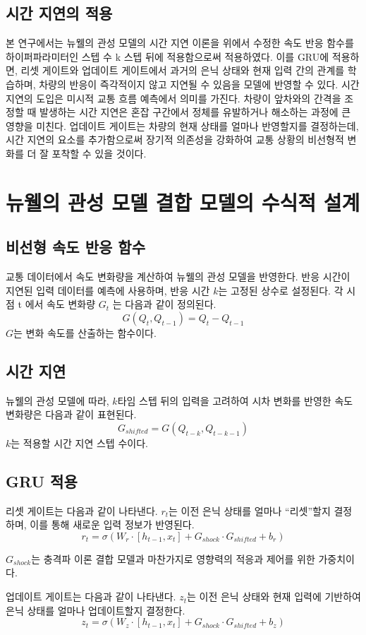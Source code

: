 \documentclass[11pt]{report}
\begin{document}
\subsection{시간 지연의 적용}
본 연구에서는 뉴웰의 관성 모델의 시간 지연 이론을 위에서 수정한 속도 반응 함수를 하이퍼파라미터인 스텝 수 k 스텝 뒤에 적용함으로써 적용하였다. 
이를 GRU에 적용하면, 리셋 게이트와 업데이트 게이트에서 과거의 은닉 상태와 현재 입력 간의 관계를 학습하며, 차량의 반응이 즉각적이지 않고 지연될 수 있음을 모델에 반영할 수 있다.
시간 지연의 도입은 미시적 교통 흐름 예측에서 의미를 가진다. 
차량이 앞차와의 간격을 조정할 때 발생하는 시간 지연은 혼잡 구간에서 정체를 유발하거나 해소하는 과정에 큰 영향을 미친다. 
업데이트 게이트는 차량의 현재 상태를 얼마나 반영할지를 결정하는데, 시간 지연의 요소를 추가함으로써 장기적 의존성을 강화하여 교통 상황의 비선형적 변화를 더 잘 포착할 수 있을 것이다.
\section{뉴웰의 관성 모델 결합 모델의 수식적 설계}
\subsection{비선형 속도 반응 함수}
교통 데이터에서 속도 변화량을 계산하여 뉴웰의 관성 모델을 반영한다. 
반응 시간이 지연된 입력 데이터를 예측에 사용하며, 반응 시간 $k$는 고정된 상수로 설정된다. 
각 시점  t 에서 속도 변화량  $G_t$ 는 다음과 같이 정의된다.
$$
G(Q_t, Q_{t-1}) = Q_t - Q_{t-1}
$$
$G$는 변화 속도를 산출하는 함수이다. 
\subsection{시간 지연}
뉴웰의 관성 모델에 따라,  $k$타임 스텝 뒤의 입력을 고려하여 시차 변화를 반영한 속도 변화량은 다음과 같이 표현된다. 
$$
G_{shifted} = G(Q_{t-k}, Q_{t-k-1})
$$
$k$는 적용할 시간 지연 스텝 수이다.

\subsection{GRU 적용}

리셋 게이트는 다음과 같이 나타낸다. 
$r_t$는 이전 은닉 상태를 얼마나 “리셋”할지 결정하며, 이를 통해 새로운 입력 정보가 반영된다.
$$
r_t = \sigma(W_r \cdot [h_{t-1}, x_t] + G_{shock} \cdot G_{shifted} + b_r)
$$

$G_{shock}$는 충격파 이론 결합 모델과 마찬가지로 영향력의 적응과 제어를 위한 가중치이다. 

업데이트 게이트는 다음과 같이 나타낸다. 
$z_t$는 이전 은닉 상태와 현재 입력에 기반하여 은닉 상태를 얼마나 업데이트할지 결정한다. 
$$
z_t = \sigma(W_z \cdot [h_{t-1}, x_t] + G_{shock} \cdot G_{shifted} + b_z)
$$
\end{document}
